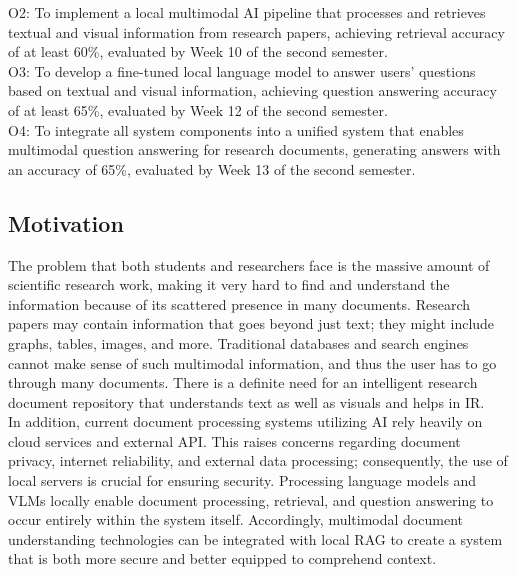 \documentclass[11pt,a4paper]{report}
\begin{document}
O2: To implement a local multimodal \ac{AI} pipeline that processes and retrieves textual and visual information from research papers, achieving retrieval accuracy of at least 60\%, evaluated by Week 10 of the second semester.\\

O3: To develop a fine-tuned local language model to answer users’ questions based on textual and visual information, achieving question answering accuracy of at least 65\%, evaluated by Week 12 of the second semester.\\

O4: To integrate all system components into a unified system that enables multimodal question answering for research documents, generating answers with an accuracy of 65\%, evaluated by Week 13 of the second semester.

\subsection{Motivation}
The problem that both students and researchers face is the massive amount of scientific research work, making it very hard to find and understand the information because of its scattered presence in many documents. Research papers may contain information that goes beyond just text; they might include graphs, tables, images, and more. Traditional databases and search engines cannot make sense of such multimodal information, and thus the user has to go through many documents. There is a definite need for an intelligent research document repository that understands text as well as visuals and helps in \ac{IR}.\\

In addition, current document processing systems utilizing \ac{AI} rely heavily on cloud services and external \ac{API}. This raises concerns regarding document privacy, internet reliability, and external data processing; consequently, the use of local servers is crucial for ensuring security. Processing language models and \acp{VLM} locally enable document processing, retrieval, and question answering to occur entirely within the system itself. Accordingly, multimodal document understanding technologies can be integrated with local \ac{RAG} to create a system that is both more secure and better equipped to comprehend context.
\end{document}

